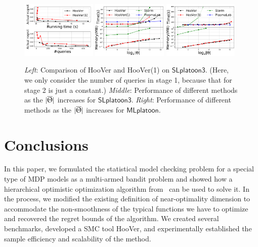 \documentclass[11pt]{article}
\theoremstyle{definition}
\newcommand{\SlplatoonThree}{{$\mathsf{SLplatoon3}$\xspace}}
\newcommand{\Mlplatoon}{{$\mathsf{MLplatoon}$\xspace}}
\newcommand{\toolname}{{{\sf HooVer}\xspace}}
\begin{document}
\begin{figure}[htbp]
    \centering
    \includegraphics[width=0.32\textwidth]{comparison_HOO_MFHOO.pdf}
    \includegraphics[width=0.32\textwidth]{rescaling_SLplatoon3_time_mem.pdf}
    \includegraphics[width=0.32\textwidth]{rescaling_MLplatoon_time_mem.pdf}
    \caption{\small \textit{Left}: Comparison of \toolname{} and \toolname(1) on \SlplatoonThree. (Here, we only consider the number of queries in stage 1, because that for stage 2 is just a constant.) \textit{Middle}: Performance of different methods as the $|\overline{\Uptheta}|$ increases for \SlplatoonThree. \textit{Right}: Performance of different methods as the $|\overline{\Uptheta}|$ increases for \Mlplatoon.}
    \label{fig:rescaling_comparison}
\end{figure}



%
\section{Conclusions}
\label{sec:conc}
In this paper, we formulated the statistical model checking problem for a special type of MDP models as a multi-armed bandit problem and showed how a hierarchical optimistic optimization algorithm from~\cite{sen2019noisy} can be used to solve it. In the process, we modified the existing definition of near-optimality dimension to  accommodate  the  non-smoothness of the typical functions we have to optimize and recovered the regret bounds of the algorithm. We created several benchmarks, developed a SMC  tool \toolname{}, and experimentally established the sample efficiency and scalability of the method.
\end{document}
